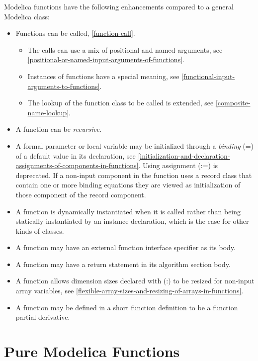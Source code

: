 \documentclass[10pt,a4paper]{report}
\def\doublelabel#1{\label{#1}}
\begin{document}
Modelica functions have the following enhancements compared to a general
Modelica class:

\begin{itemize}
\item
  Functions can be called, \ref{function-call}.

  \begin{itemize}
  \item
    The calls can use a mix of positional and named arguments, see
    \ref{positional-or-named-input-arguments-of-functions}.
  \item
    Instances of functions have a special meaning, see \ref{functional-input-arguments-to-functions}.
  \item
    The lookup of the function class to be called is extended, see
    \ref{composite-name-lookup}.
  \end{itemize}
\item
  A function can be \emph{recursive}.
\item
  A formal parameter or local variable may be initialized through a
  \emph{binding} (=) of a default value in its declaration, 
  see \ref{initialization-and-declaration-assignments-of-components-in-functions}.
  Using assignment (:=) is deprecated. If a non-input component in the
  function uses a record class that contain one or more binding
  equations they are viewed as initialization of those component of the
  record component.
\item
  A function is dynamically instantiated when it is called rather than
  being statically instantiated by an instance declaration, which is the
  case for other kinds of classes.
\item
  A function may have an external function interface specifier as its
  body.
\item
  A function may have a return statement in its algorithm section body.
\item
  A function allows dimension sizes declared with (:) to be resized for
  non-input array variables, see \ref{flexible-array-sizes-and-resizing-of-arrays-in-functions}.
\item
  A function may be defined in a short function definition to be a
  function partial derivative.
\end{itemize}

\section{Pure Modelica Functions}\doublelabel{pure-modelica-functions}
\end{document}
